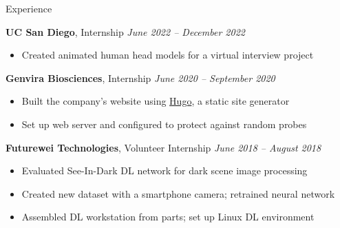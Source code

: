 	\begin{rSection}{Experience}

		{\bf UC San Diego}{, Internship} \hfill {\em June 2022 -- December 2022}
		\begin{itemize}
			\item Created animated human head models for a virtual interview project
		\end{itemize}

		{\bf Genvira Biosciences}{, Internship} \hfill {\em June 2020 -- September 2020}
		\begin{itemize}
			\item Built the company's website using \href{https://gohugo.io/}{Hugo}, a static site generator
			\item Set up web server and configured to protect against random probes
		\end{itemize}

		{\bf Futurewei Technologies}{, Volunteer Internship} \hfill {\em June 2018 -- August 2018}
		\begin{itemize}
			\item Evaluated See-In-Dark DL network for dark scene image processing
			\item Created new dataset with a smartphone camera; retrained neural network
			\item Assembled DL workstation from parts; set up Linux DL environment
		\end{itemize}
	\end{rSection}
	
